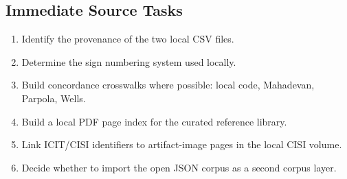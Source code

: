 \subsection{Immediate Source Tasks}

\begin{enumerate}
  \item Identify the provenance of the two local CSV files.
  \item Determine the sign numbering system used locally.
  \item Build concordance crosswalks where possible: local code, Mahadevan, Parpola, Wells.
  \item Build a local PDF page index for the curated reference library.
  \item Link ICIT/CISI identifiers to artifact-image pages in the local CISI volume.
  \item Decide whether to import the open JSON corpus as a second corpus layer.
\end{enumerate}
